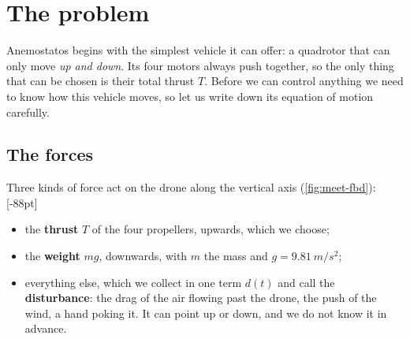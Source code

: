 \label{les:meet}


\section{The problem}

Anemostatos begins with the simplest vehicle it can offer: a quadrotor that can only move \emph{up and down}. Its four motors always push together, so the only thing that can be chosen is their total thrust $T$. Before we can control anything we need to know how this vehicle moves, so let us write down its equation of motion carefully.

\subsection{The forces}
Three kinds of force act on the drone along the vertical axis (\cref{fig:meet-fbd}):
[-88pt]
\begin{itemize}
  \item the \textbf{thrust} $T$ of the four propellers, upwards, which we choose;
  \item the \textbf{weight} $mg$, downwards, with $m$ the mass and $g = \SI{9.81}{m/s^2}$;
  \item everything else, which we collect in one term $d(t)$ and call the \textbf{disturbance}: the drag of the air flowing past the drone, the push of the wind, a hand poking it. It can point up or down, and we do not know it in advance.
\end{itemize}

